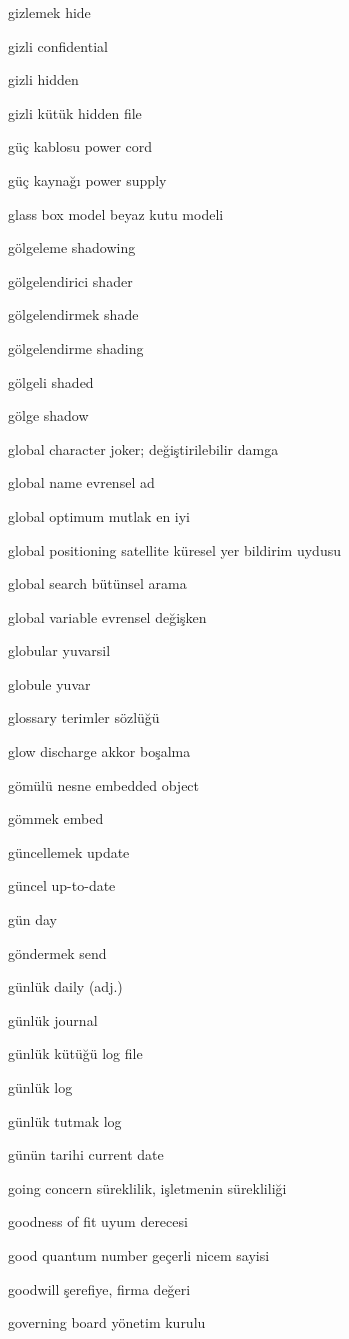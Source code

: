 \documentclass[12pt,fleqn]{article}\usepackage{../../common}
\begin{document}
gizlemek hide

gizli confidential

gizli hidden

gizli kütük hidden file

güç kablosu power cord

güç kaynağı power supply

glass box model beyaz kutu modeli

gölgeleme shadowing

gölgelendirici shader

gölgelendirmek shade

gölgelendirme shading

gölgeli shaded

gölge shadow

global character joker; değiştirilebilir damga

global name evrensel ad

global optimum mutlak en iyi

global positioning satellite küresel yer bildirim uydusu

global search bütünsel arama

global variable evrensel değişken

globular yuvarsil

globule yuvar

glossary terimler sözlüğü

glow discharge akkor boşalma

gömülü nesne embedded object

gömmek embed

güncellemek update

güncel up-to-date

gün day

göndermek send

günlük daily (adj.)

günlük journal

günlük kütüğü log file

günlük log

günlük tutmak log

günün tarihi current date

going concern süreklilik, işletmenin sürekliliği

goodness of fit uyum derecesi

good quantum number geçerli nicem sayisi

goodwill şerefiye, firma değeri

governing board yönetim kurulu
\end{document}
